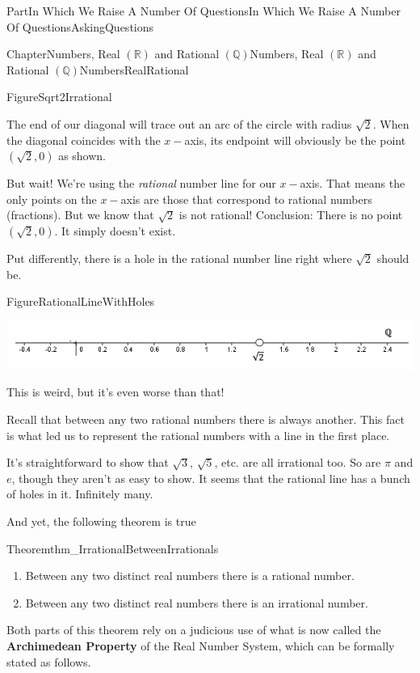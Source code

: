 \documentclass[oneside,10pt,]{book}
\newcommand{\terminology}[1]{\textbf{#1}}
\numberwithin{equation}{part}
\newcommand{\RR}{\mathbb {R}}
\newcommand{\QQ}{\mathbb {Q}}
\begin{document}
\begin{partptx}{Part}{In Which We Raise A Number Of Questions}{}{In Which We Raise A Number Of Questions}{}{}{AskingQuestions}
\begin{chapterptx}{Chapter}{Numbers, Real \(\left(\RR\right)\) and Rational \(\left(\QQ\right)\)}{}{Numbers, Real \(\left(\RR\right)\) and Rational \(\left(\QQ\right)\)}{}{}{NumbersRealRational}
\begin{figureptx}{Figure}{}{Sqrt2Irrational}{}
\begin{image}{0.25}{0.5}{0.25}{}
\end{image}%
\tcblower
\end{figureptx}%
The end of our diagonal will trace out an arc of the circle with radius \(\sqrt{2}\). When the diagonal coincides with the \(x-\)axis, its endpoint will obviously be the point \((\sqrt{2}, 0)\) as shown.%
\par
But wait! We're using the \emph{rational} number line for our \(x-\)axis. That means the only points on the \(x-\)axis are those that correspond to rational numbers (fractions). But we know that \(\sqrt{2}\) is not rational! Conclusion: There is no point \((\sqrt{2},0)\). It simply doesn't exist.%
\par
Put differently, there is a hole in the rational number line right where \(\sqrt{2}\) should be.%
\begin{figureptx}{Figure}{}{RationalLineWithHoles}{}%
\begin{image}{0}{1}{0}{}%
\includegraphics[width=\linewidth]{external/images/RationalLineWithHoles.png}
\end{image}%
\tcblower
\end{figureptx}%
This is weird,  but it's even worse than that!%
\par
Recall that between any two rational numbers there is always another.  This fact is what led us to represent the rational numbers with a line in the first place.%
\par
It's straightforward to show that \(\sqrt{3}\), \(\sqrt{5}\), etc. are all irrational too. So are \(\pi\) and \(e\), though they aren't as easy to show. It seems that the rational line has a bunch of holes in it. Infinitely many.%
\par
And yet, the following theorem is true%
\begin{theorem}{Theorem}{}{}{thm_IrrationalBetweenIrrationals}%
\index{\(\RR\)!real numbers exist between real numbers}%
%
\begin{enumerate}[label={(\alph*)}]
\item{}Between any two distinct real numbers there is a rational number.%
\item{}Between any two distinct real numbers there is an irrational number.%
\end{enumerate}
%
\end{theorem}
Both parts of this theorem rely on a judicious use of what is now called the \terminology{Archimedean Property} of the Real Number System, which can be formally stated as follows.%

\end{chapterptx}
\end{partptx}
\end{document}
